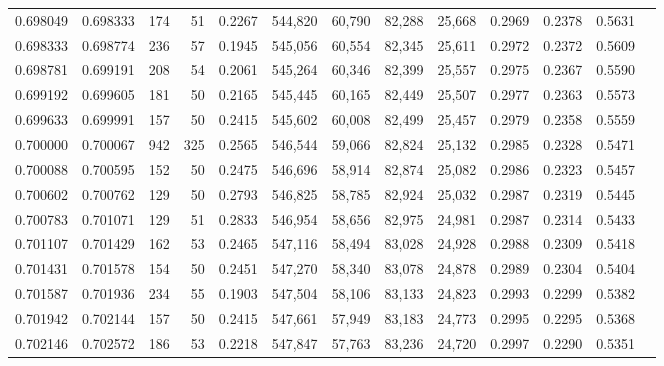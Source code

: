 \begin{tabular}{rrrrrrrrrrrrr}
0.698049 & 0.698333 &    174 &    51 &                                     0.2267 & 544,820 &  60,790 &  82,288 &  25,668 & 0.2969 & 0.2378 & 0.5631 \\
0.698333 & 0.698774 &    236 &    57 &                                     0.1945 & 545,056 &  60,554 &  82,345 &  25,611 & 0.2972 & 0.2372 & 0.5609 \\
0.698781 & 0.699191 &    208 &    54 &                                     0.2061 & 545,264 &  60,346 &  82,399 &  25,557 & 0.2975 & 0.2367 & 0.5590 \\
0.699192 & 0.699605 &    181 &    50 &                                     0.2165 & 545,445 &  60,165 &  82,449 &  25,507 & 0.2977 & 0.2363 & 0.5573 \\
0.699633 & 0.699991 &    157 &    50 &                                     0.2415 & 545,602 &  60,008 &  82,499 &  25,457 & 0.2979 & 0.2358 & 0.5559 \\
0.700000 & 0.700067 &    942 &   325 &                                     0.2565 & 546,544 &  59,066 &  82,824 &  25,132 & 0.2985 & 0.2328 & 0.5471 \\
0.700088 & 0.700595 &    152 &    50 &                                     0.2475 & 546,696 &  58,914 &  82,874 &  25,082 & 0.2986 & 0.2323 & 0.5457 \\
0.700602 & 0.700762 &    129 &    50 &                                     0.2793 & 546,825 &  58,785 &  82,924 &  25,032 & 0.2987 & 0.2319 & 0.5445 \\
0.700783 & 0.701071 &    129 &    51 &                                     0.2833 & 546,954 &  58,656 &  82,975 &  24,981 & 0.2987 & 0.2314 & 0.5433 \\
0.701107 & 0.701429 &    162 &    53 &                                     0.2465 & 547,116 &  58,494 &  83,028 &  24,928 & 0.2988 & 0.2309 & 0.5418 \\
0.701431 & 0.701578 &    154 &    50 &                                     0.2451 & 547,270 &  58,340 &  83,078 &  24,878 & 0.2989 & 0.2304 & 0.5404 \\
0.701587 & 0.701936 &    234 &    55 &                                     0.1903 & 547,504 &  58,106 &  83,133 &  24,823 & 0.2993 & 0.2299 & 0.5382 \\
0.701942 & 0.702144 &    157 &    50 &                                     0.2415 & 547,661 &  57,949 &  83,183 &  24,773 & 0.2995 & 0.2295 & 0.5368 \\
0.702146 & 0.702572 &    186 &    53 &                                     0.2218 & 547,847 &  57,763 &  83,236 &  24,720 & 0.2997 & 0.2290 & 0.5351 \\

\end{tabular}
